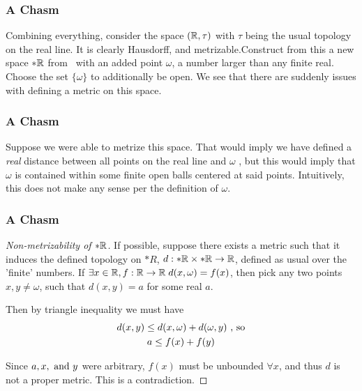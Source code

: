 \begin{frame}
    \frametitle{A Chasm}

    Combining everything, consider the space \((\mathbb{R}, \tau)\) with \(\tau\)
    being the usual topology on the real line. It is clearly Hausdorff, and
    metrizable.\pause Construct from this a new space \(*\mathbb{R}\) from \reals\,
    with an added point \(\omega\), a number larger than any finite real. Choose
    the set \(\{\omega\}\) to additionally be open. \pause We see that there are
    suddenly issues with defining a metric on this space.

\end{frame}

\begin{frame}
    \frametitle{A Chasm}

    Suppose we were able to metrize this space. That would imply we have defined
    a \emph{real} distance between all points on the real line and \(\omega\)
    \pause, but this would imply that \(\omega\) is contained within some finite
    open balls centered at said points. Intuitively, this does not make any
    sense per the definition of \(\omega\).

\end{frame}

\begin{frame}
    \frametitle{A Chasm}

    \begin{proof}[Non-metrizability of \(*\mathbb{R}\)]
        If possible, suppose there exists a metric such that it induces the
        defined topology on \(*R\), \(d:*\mathbb{R} \times *\mathbb{R} \to \mathbb{R}\),
        defined as usual over the 'finite' numbers. \pause If \(\exists x \in
        \mathbb{R}, f:\mathbb{R} \to \mathbb{R}\; d(x, \omega) = f(x)\), then pick any two
        points \(x, y \not = \omega\), such that \(d(x, y) = a\) for some real
        \(a\). 
        
        \pause 
        Then by triangle inequality we must have
        \begin{gather*}
            d(x, y) \leq d(x, \omega) + d(\omega, y) \textnormal{ , so} \\
            a \leq f(x) + f(y)
        \end{gather*}

        Since \(a, x, \textnormal{ and } y\) were arbitrary, \(f(x)\) must be
        unbounded \(\forall x\), and thus \(d\) is not a proper metric. This is
        a contradiction. 
    \end{proof}

\end{frame}